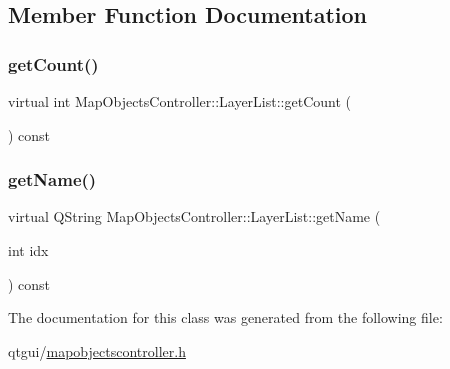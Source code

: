 \subsection{Member Function Documentation}
\mbox{\label{class_map_objects_controller_1_1_layer_list_a0f70c2fae48c5054a11c4c79762cca1f}} 
\subsubsection{\texorpdfstring{getCount()}{getCount()}}
{\footnotesize\ttfamily virtual int Map\+Objects\+Controller\+::\+Layer\+List\+::get\+Count (\begin{DoxyParamCaption}{ }\end{DoxyParamCaption}) const\hspace{0.3cm}{\ttfamily [pure virtual]}}

\mbox{\label{class_map_objects_controller_1_1_layer_list_a96858a1defaf842f18563bb5a7c594cf}} 
\subsubsection{\texorpdfstring{getName()}{getName()}}
{\footnotesize\ttfamily virtual Q\+String Map\+Objects\+Controller\+::\+Layer\+List\+::get\+Name (\begin{DoxyParamCaption}\item[{int}]{idx }\end{DoxyParamCaption}) const\hspace{0.3cm}{\ttfamily [pure virtual]}}



The documentation for this class was generated from the following file\+:\begin{DoxyCompactItemize}
\item 
qtgui/\mbox{\hyperlink{mapobjectscontroller_8h}{mapobjectscontroller.\+h}}\end{DoxyCompactItemize}
